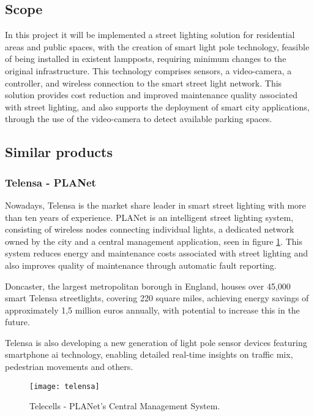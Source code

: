 \subsection{Scope}

In this project it will be implemented a street lighting solution for residential areas and public spaces, with the creation of smart light pole technology, feasible of being installed in existent lampposts, requiring minimum changes to the original infrastructure. This technology comprises sensors, a video-camera, a controller, and wireless connection to the smart street light network. This solution provides cost reduction and improved maintenance quality associated with street lighting, and also supports the deployment of smart city applications, through the use of the video-camera to detect available parking spaces.

\subsection{Similar products}

\subsubsection{Telensa - PLANet}

Nowadays, Telensa is the market share leader in smart street lighting with more than ten years of experience.\cite{telensa} PLANet is an intelligent street lighting system, consisting of wireless nodes connecting individual lights, a dedicated network owned by the city and a central management application, seen in figure \ref{fig:telensa}. This system reduces energy and maintenance costs associated with street lighting and also improves quality of maintenance through automatic fault reporting.

Doncaster, the largest metropolitan borough in England, houses over 45,000 smart Telensa streetlights, covering 220 square miles, achieving energy savings of approximately 1,5 million euros annually, with potential to increase this in the future.

Telensa is also developing a new generation of light pole sensor devices featuring smartphone \ac{ai} technology, enabling detailed real-time insights on traffic mix, pedestrian movements and others.

\begin{figure}[ht]
	\centering
	\texttt{[image: telensa]}
	\caption{Telecells - PLANet's Central Management System.}
	\label{fig:telensa}
\end{figure}


